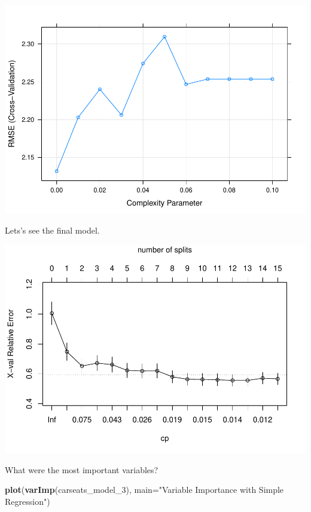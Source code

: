 \documentclass[]{book}
\newenvironment{Shaded}{\begin{snugshade}}{\end{snugshade}}
\newcommand{\DataTypeTok}[1]{\textcolor[rgb]{0.13,0.29,0.53}{#1}}
\newcommand{\DecValTok}[1]{\textcolor[rgb]{0.00,0.00,0.81}{#1}}
\newcommand{\KeywordTok}[1]{\textcolor[rgb]{0.13,0.29,0.53}{\textbf{#1}}}
\newcommand{\NormalTok}[1]{#1}
\newcommand{\OperatorTok}[1]{\textcolor[rgb]{0.81,0.36,0.00}{\textbf{#1}}}
\newcommand{\StringTok}[1]{\textcolor[rgb]{0.31,0.60,0.02}{#1}}
\begin{document}
\includegraphics{data-sci_files/figure-latex/unnamed-chunk-74-1.pdf}

Lets's see the final model.

\begin{Shaded}
\end{Shaded}

\includegraphics{data-sci_files/figure-latex/unnamed-chunk-75-1.pdf}

What were the most important variables?

\begin{Shaded}
\begin{Highlighting}[]
\KeywordTok{plot}\NormalTok{(}\KeywordTok{varImp}\NormalTok{(carseats_model_}\DecValTok{3}\NormalTok{), }\DataTypeTok{main=}\StringTok{"Variable Importance with Simple Regression"}\NormalTok{)}
\end{Highlighting}
\end{Shaded}
\end{document}
